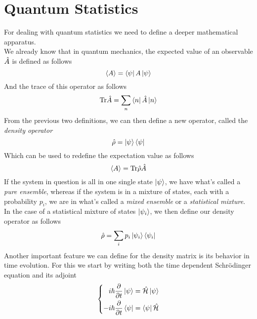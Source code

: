 \documentclass[../qm.tex]{subfiles}
\begin{document}
		\section{Quantum Statistics}
		For dealing with quantum statistics we need to define a deeper mathematical apparatus.\\
		We already know that in quantum mechanics, the expected value of an observable $\hat{A}$ is defined as follows
		\begin{equation*}
			\expval{A}=\bra{\psi}A\ket{\psi}
		\end{equation*}
		And the trace of this operator as follows
		\begin{equation}
			\mathrm{Tr}{\hat{A}}=\sum_n\bra{n}\hat{A}\ket{n}
			\label{eq:traceqm}
		\end{equation}
		From the previous two definitions, we can then define a new operator, called the \textit{density operator}
		\begin{equation}
			\hat{\rho}=\ket{\psi}\bra{\psi}
			\label{eq:densityoperatordefinition}
		\end{equation}
		Which can be used to redefine the expectation value as follows
		\begin{equation}
			\expval{A}=\mathrm{Tr}{\hat{\rho}\hat{A}}
			\label{eq:expectationvaluerhooperator}
		\end{equation}
		If the system in question is all in one single state $\ket{\psi}$, we have what's called a \textit{pure ensemble}, whereas if the system is in a mixture of states, each with a probability $p_i$, we are in what's called a \textit{mixed ensemble} or a \textit{statistical mixture}.\\
		In the case of a statistical mixture of states $\ket{\psi_i}$, we then define our density operator as follows
		\begin{equation}
			\hat{\rho}=\sum_ip_i\ket{\psi_i}\bra{\psi_i}
			\label{eq:mixeddensitymatrix}
		\end{equation}
		Another important feature we can define for the density matrix is its behavior in time evolution. For this we start by writing both the time dependent Schrödinger equation and its adjoint
		\begin{equation}
			\left\{\begin{aligned}
					i\hbar\pdv{t}\ket{\psi}&=\hat{\mathcal{H}}\ket{\psi}\\
					-i\hbar\pdv{t}\bra{\psi}&=\bra{\psi}\hat{\mathcal{H}}
			\end{aligned}\right.
			\label{eq:schrodingervonneumann}
		\end{equation}
\end{document}

